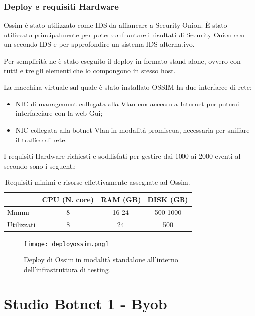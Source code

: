 \subsection*{Deploy e requisiti Hardware}

Ossim è stato utilizzato come IDS da affiancare a Security Onion. È stato utilizzato principalmente per poter confrontare i risultati di Security Onion con un secondo IDS e per approfondire un sistema  IDS alternativo.

Per semplicità ne è stato eseguito il deploy in formato stand-alone, ovvero con tutti e tre gli elementi che lo compongono in stesso host.

La macchina virtuale sul quale è stato installato OSSIM ha due interfacce di rete:
\begin{itemize}
    \item  NIC di management collegata alla Vlan con accesso a Internet per potersi interfacciare con la web Gui;
    \item  NIC collegata alla botnet Vlan in modalità promiscua, necessaria per sniffare il traffico di rete.
\end{itemize} 

I requisiti Hardware richiesti  e soddisfati per gestire dai 1000 ai 2000  eventi al secondo sono i seguenti:
\begin{table}[hbtp]
    \centering
    \begin{tabular}{|l|c|c|c|}
        \hline
        & CPU (N. core) & RAM (GB) & DISK (GB) \\
        \hline
        Minimi     & 8 & 16-24 & 500-1000   \\
        \hline
        Utilizzati &  8  & 24 & 500 \\
        \hline
    \end{tabular}
    \caption{Requisiti minimi e risorse effettivamente assegnate ad Ossim.}
    \label{tab:requisitiHw4}
\end{table}

\begin{figure}[hbtp]
    \centering 
    \texttt{[image: deployossim.png]}
    \caption{Deploy di Ossim in modalità standalone all'interno dell'infrastruttura di testing.}
    \label{fig:deployossim}
\end{figure}

\chapter{Studio Botnet 1 - Byob}
    

